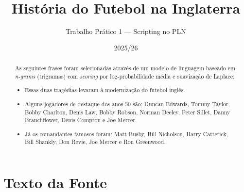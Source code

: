 \documentclass[a4paper,12pt]{article}
\title{História do Futebol na Inglaterra}
\author{Trabalho Prático 1 --- Scripting no PLN}
\date{2025/26}
\begin{document}
\maketitle

\begin{abstract}
As seguintes frases foram selecionadas através de um modelo de linguagem
baseado em \textit{n-grams} (trigramas) com \textit{scoring} por
log-probabilidade média e suavização de Laplace:
\begin{itemize}
  \item Essas duas tragédias levaram à modernização do futebol inglês.
  \item Alguns jogadores de destaque dos anos 50 são: Duncan Edwards, Tommy Taylor, Bobby Charlton, Denis Law, Bobby Robson, Norman Deeley, Peter Sillet, Danny Branchflower, Denis Compton e Joe Mercer.
  \item Já os comandantes famosos foram: Matt Busby, Bill Nicholson, Harry Catterick, Bill Shankly, Don Revie, Joe Mercer e Ron Greenwood.
\end{itemize}
\end{abstract}

\section{Texto da Fonte}
\end{document}
